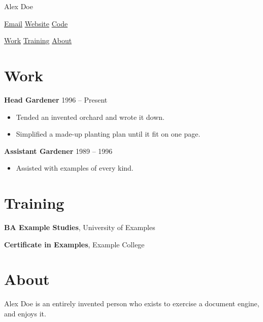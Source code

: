\documentclass{webpage}
\begin{document}
\begin{center}
  {\Huge\sffamily Alex Doe}\\

  \href{mailto:alex@example.org}{Email} \middot
  \href{https://example.org/alex}{Website} \middot
  \href{https://example.org/code}{Code}

  \href{#work}{Work} \middot
  \href{#training}{Training} \middot
  \href{#about}{About}
\end{center}

\section*{Work}

\textbf{Head Gardener} \hfill 1996 -- Present\par
{}
\begin{itemize}
  \item Tended an invented orchard and wrote it down.
  \item Simplified a made-up planting plan until it fit on one page.
\end{itemize}

\textbf{Assistant Gardener} \hfill 1989 -- 1996\par
{}
\begin{itemize}
  \item Assisted with examples of every kind.
\end{itemize}

\section*{Training}

\textbf{BA Example Studies}, University of Examples\par
{}

\textbf{Certificate in Examples}, Example College

\section*{About}

Alex Doe is an entirely invented person who exists to exercise a
document engine, and enjoys it.
\end{document}
